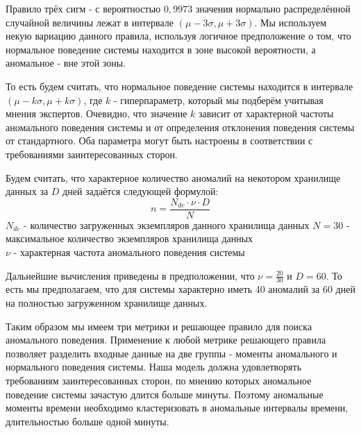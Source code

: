 \documentclass[14pt, a4paper]{extarticle}
\begin{document}
	Правило трёх сигм - с вероятностью  $0,9973$  значения нормально распределённой случайной величины лежат в интервале $(\mu - 3\sigma,\mu +3 \sigma)$. Мы используем некую вариацию данного правила, используя логичное предположение о том, что нормальное поведение системы находится в зоне высокой вероятности, а аномальное - вне этой зоны. 
	
	То есть будем считать, что нормальное поведение системы находится в интервале $(\mu - k\sigma,\mu +k \sigma)$, где $k$ - гиперпараметр, который мы подберём учитывая мнения экспертов. Очевидно, что значение $k$ зависит от характерной частоты аномального поведения системы и от определения отклонения поведения системы от стандартного. Оба параметра могут быть настроены в соответствии с требованиями заинтересованных сторон.
	
	Будем считать, что характерное количество аномалий на некотором хранилище данных за $D$ дней задаётся следующей формулой:
	$$ n = \dfrac{N_{dc}\cdot \nu \cdot D}{N}$$
	$N_{dc}$ - количество загруженных экземпляров данного хранилища данных 
	$N = 30 $ - максимальное количество экземпляров хранилища данных \\
	$\nu$ - характерная частота аномального поведения системы 

	Дальнейшие вычисления приведены в предположении, что  $\nu= \frac{20}{30}$ и $D = 60$. То есть мы предполагаем, что для системы характерно иметь 40 аномалий за 60 дней на полностью загруженном хранилище данных.
	
	Таким образом мы имеем три метрики и решающее правило для поиска аномального поведения. Применение к любой метрике  решающего правила позволяет разделить входные данные на две группы - моменты аномального и нормального поведения системы. Наша модель должна удовлетворять требованиям заинтересованных сторон, по мнению которых аномальное поведение системы зачастую длится больше минуты. Поэтому аномальные моменты времени необходимо кластеризовать в аномальные интервалы времени, длительностью  больше одной минуты.
	
\end{document}
